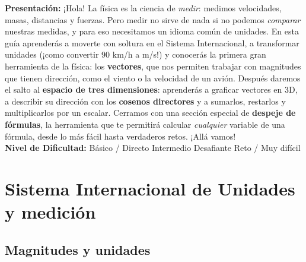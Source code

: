 \documentclass[12pt, letterpaper]{article}
\begin{document}


\vspace{4pt}
\begin{cuadroinfo}
  \small
  \textbf{Presentación:} ¡Hola! La física es la ciencia de \emph{medir}: medimos velocidades, masas, distancias y fuerzas. Pero medir no sirve de nada si no podemos \emph{comparar} nuestras medidas, y para eso necesitamos un idioma común de unidades. En esta guía aprenderás a moverte con soltura en el Sistema Internacional, a transformar unidades (¡como convertir 90 km/h a m/s!) y conocerás la primera gran herramienta de la física: los \textbf{vectores}, que nos permiten trabajar con magnitudes que tienen dirección, como el viento o la velocidad de un avión. Después daremos el salto al \textbf{espacio de tres dimensiones}: aprenderás a graficar vectores en 3D, a describir su dirección con los \textbf{cosenos directores} y a sumarlos, restarlos y multiplicarlos por un escalar. Cerramos con una sección especial de \textbf{despeje de fórmulas}, la herramienta que te permitirá calcular \emph{cualquier} variable de una fórmula, desde lo más fácil hasta verdaderos retos. ¡Allá vamos!
  \\[4pt]
  \textbf{Nivel de Dificultad:}\quad
  \facil{} Básico / Directo \quad
  \medio{} Intermedio \quad
  \dificil{} Desafiante \quad
  \muyDificil{} Reto / Muy difícil
\end{cuadroinfo}

\vspace{8pt}

\section{Sistema Internacional de Unidades y medición}

\subsection{Magnitudes y unidades}
\end{document}
